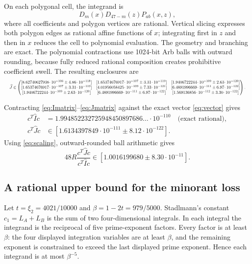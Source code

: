\documentclass[11pt]{article}
\theoremstyle{definition}
\theoremstyle{remark}
\begin{document}
On each polygonal cell, the integrand is
\[
 D_m(x)D_{47-m}(z)P_{ab}(x,z),
\]
where all coefficients and polygon vertices are rational.  Vertical slicing
expresses both polygon edges as rational affine functions of \(x\); integrating
first in \(z\) and then in \(x\) reduces the cell to polynomial evaluation.
The geometry and branching are exact.  The polynomial contractions use
1024-bit Arb balls with outward rounding, because fully reduced rational
composition creates prohibitive coefficient swell.  The resulting enclosures
are
\begin{equation}
\label{eq:Jmatrix}
\resizebox{\textwidth}{!}{$\displaystyle
\widehat J\in\begin{pmatrix}
[8.62740627938\!\cdot10^{-106}\pm4.86\!\cdot10^{-118}]&[1.65374676917\!\cdot10^{-107}\pm3.31\!\cdot10^{-119}]&[1.9406722244\!\cdot10^{-109}\pm2.63\!\cdot10^{-120}]\\
[1.65374676917\!\cdot10^{-107}\pm3.31\!\cdot10^{-119}]&[4.01956058425\!\cdot10^{-109}\pm7.33\!\cdot10^{-121}]&[6.4891996669\!\cdot10^{-111}\pm6.97\!\cdot10^{-122}]\\
[1.9406722244\!\cdot10^{-109}\pm2.63\!\cdot10^{-120}]&[6.4891996669\!\cdot10^{-111}\pm6.97\!\cdot10^{-122}]&[1.569136856\!\cdot10^{-112}\pm3.30\!\cdot10^{-122}]
\end{pmatrix}. $}
\end{equation}

Contracting \eqref{eq:Imatrix}--\eqref{eq:Jmatrix} against the exact vector
\eqref{eq:vector} gives
\begin{align}
 c^{\!T}\widehat Ic
 &=1.994852232725948450897686\ldots\cdot10^{-110}
   \quad\text{(exact rational)},\label{eq:Iquad}\\
 c^{\!T}\widehat Jc
 &\in[1.6134397849\cdot10^{-111}\pm8.12\cdot10^{-122}].\label{eq:Jquad}
\end{align}
Using \eqref{eq:scaling}, outward-rounded ball arithmetic gives
\begin{equation}
\label{eq:rawball}
 48R\frac{c^{\!T}\widehat Jc}{c^{\!T}\widehat Ic}
 \in[1.0016199680\pm8.30\cdot10^{-11}].
\end{equation}

\subsection{A rational upper bound for the minorant loss}
\label{sec:loss}

Let \(t=\xi_2=4021/10000\) and \(\beta=1-2t=979/5000\).  Stadlmann's
constant \(c_1=L_A+L_B\) is the sum of two four-dimensional integrals.  In
each integral the integrand is the reciprocal of five prime-exponent factors.
Every factor is at least \(\beta\): the four displayed integration variables
are at least \(\beta\), and the remaining exponent is constrained to exceed
the last displayed prime exponent.  Hence each integrand is at most
\(\beta^{-5}\).
\end{document}
